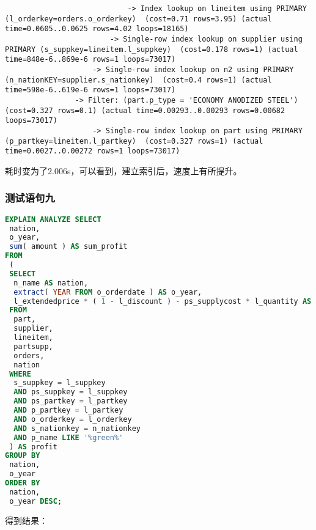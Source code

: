 \documentclass{article}
\begin{document}
\begin{lstlisting}
                            -> Index lookup on lineitem using PRIMARY (l_orderkey=orders.o_orderkey)  (cost=0.71 rows=3.95) (actual time=0.0605..0.0625 rows=4.02 loops=18165)
                        -> Single-row index lookup on supplier using PRIMARY (s_suppkey=lineitem.l_suppkey)  (cost=0.178 rows=1) (actual time=848e-6..869e-6 rows=1 loops=73017)
                    -> Single-row index lookup on n2 using PRIMARY (n_nationKEY=supplier.s_nationkey)  (cost=0.4 rows=1) (actual time=598e-6..619e-6 rows=1 loops=73017)
                -> Filter: (part.p_type = 'ECONOMY ANODIZED STEEL')  (cost=0.327 rows=0.1) (actual time=0.00293..0.00293 rows=0.00682 loops=73017)
                    -> Single-row index lookup on part using PRIMARY (p_partkey=lineitem.l_partkey)  (cost=0.327 rows=1) (actual time=0.0027..0.00272 rows=1 loops=73017)
\end{lstlisting}

耗时变为了2.006s，可以看到，建立索引后，速度上有所提升。

\subsubsection{测试语句九}

\begin{lstlisting}[language=sql]
EXPLAIN ANALYZE SELECT
 nation,
 o_year,
 sum( amount ) AS sum_profit 
FROM
 (
 SELECT
  n_name AS nation,
  extract( YEAR FROM o_orderdate ) AS o_year,
  l_extendedprice * ( 1 - l_discount ) - ps_supplycost * l_quantity AS amount 
 FROM
  part,
  supplier,
  lineitem,
  partsupp,
  orders,
  nation 
 WHERE
  s_suppkey = l_suppkey 
  AND ps_suppkey = l_suppkey 
  AND ps_partkey = l_partkey 
  AND p_partkey = l_partkey 
  AND o_orderkey = l_orderkey 
  AND s_nationkey = n_nationkey 
  AND p_name LIKE '%green%' 
 ) AS profit 
GROUP BY
 nation,
 o_year 
ORDER BY
 nation,
 o_year DESC;
\end{lstlisting}

得到结果：
\end{document}
